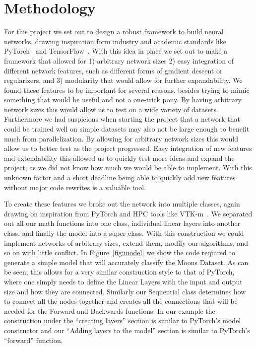 \section{Methodology}\label{sec:method}

For this project we set out to design a robust framework to build neural
networks, drawing inspiration form industry and academic standards like
PyTorch~\cite{NEURIPS2019_9015} and TensorFlow~\cite{tensorflow2015}. With this
idea in place we set out to make a framework that allowed for 1) arbitrary
network sizes 2) easy integration of different network features, such as
different forms of gradient descent or regularizers, and 3) modularity that
would allow for further expandability. We found these features to be important
for several reasons, besides trying to mimic something that would be useful and
not a one-trick pony. By having arbitrary network sizes this would allow us to
test on a wide variety of datasets. Furthermore we had suspicions when starting
the project that a network that could be trained well on simple datasets may
also not be large enough to benefit much from parallelization. By allowing for
arbitrary network sizes this would allow us to better test as the project
progressed. Easy integration of new features and extendability this allowed us
to quickly test more ideas and expand the project, as we did not know how much
we would be able to implement. With this unknown factor and a short deadline
being able to quickly add new features without major code rewrites is a
valuable tool. 

To create these features we broke out the network into multiple classes, again
drawing on inspiration from PyTorch and HPC tools like VTK-m~\cite{7466740}. We
separated out all our math functions into one class, individual linear layers
into another class, and finally the model into a super class. With this
construction we could implement networks of arbitrary sizes, extend them,
modify our algorithms, and so on with little conflict. In
Figure~\ref{fig:model} we show the code required to generate a simple model
that will accurately classify the Moons Dataset. As can be seen, this allows
for a very similar construction style to that of PyTorch, where one simply
needs to define the Linear Layers with the input and output size and how they
are connected. Similarly our Sequential class determines how to connect all the
nodes together and creates all the connections that will be needed for the
Forward and Backwards functions. In our example the construction under the
``creating layers'' section is similar to PyTorch's model constructor and our
``Adding layers to the model'' section is similar to PyTorch's ``forward''
function.


